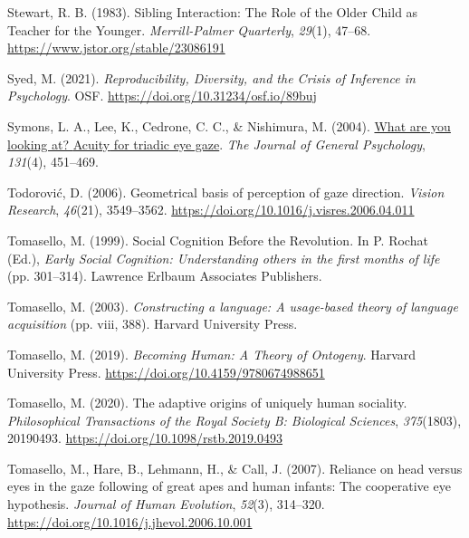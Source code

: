 \documentclass[
]{scrbook}
\newlength{\cslhangindent}
\newenvironment{CSLReferences}[2] %
 {\begin{list}{}{%
  \setlength{\itemindent}{0pt}
  \setlength{\leftmargin}{0pt}
  \setlength{\parsep}{0pt}
  \ifodd #1
   \setlength{\leftmargin}{\cslhangindent}
   \setlength{\itemindent}{-1\cslhangindent}
  \fi
  \setlength{\itemsep}{#2\baselineskip}}}
 {\end{list}}
\begin{document}
\begin{CSLReferences}{1}{0}
Stewart, R. B. (1983). Sibling {Interaction}: {The Role} of the {Older Child} as {Teacher} for the {Younger}. \emph{Merrill-Palmer Quarterly}, \emph{29}(1), 47--68. \url{https://www.jstor.org/stable/23086191}

Syed, M. (2021). \emph{Reproducibility, {Diversity}, and the {Crisis} of {Inference} in {Psychology}}. OSF. \url{https://doi.org/10.31234/osf.io/89buj}

Symons, L. A., Lee, K., Cedrone, C. C., \& Nishimura, M. (2004). \href{https://www.ncbi.nlm.nih.gov/pmc/articles/PMC2564292}{What are you looking at? {Acuity} for triadic eye gaze}. \emph{The Journal of General Psychology}, \emph{131}(4), 451--469.

Todorović, D. (2006). Geometrical basis of perception of gaze direction. \emph{Vision Research}, \emph{46}(21), 3549--3562. \url{https://doi.org/10.1016/j.visres.2006.04.011}

Tomasello, M. (1999). Social {Cognition Before} the {Revolution}. In P. Rochat (Ed.), \emph{Early {Social Cognition}: {Understanding} others in the first months of life} (pp. 301--314). Lawrence Erlbaum Associates Publishers.

Tomasello, M. (2003). \emph{Constructing a language: {A} usage-based theory of language acquisition} (pp. viii, 388). Harvard University Press.

Tomasello, M. (2019). \emph{Becoming {Human}: {A Theory} of {Ontogeny}}. Harvard University Press. \url{https://doi.org/10.4159/9780674988651}

Tomasello, M. (2020). The adaptive origins of uniquely human sociality. \emph{Philosophical Transactions of the Royal Society B: Biological Sciences}, \emph{375}(1803), 20190493. \url{https://doi.org/10.1098/rstb.2019.0493}

Tomasello, M., Hare, B., Lehmann, H., \& Call, J. (2007). Reliance on head versus eyes in the gaze following of great apes and human infants: The cooperative eye hypothesis. \emph{Journal of Human Evolution}, \emph{52}(3), 314--320. \url{https://doi.org/10.1016/j.jhevol.2006.10.001}


\end{CSLReferences}
\end{document}
